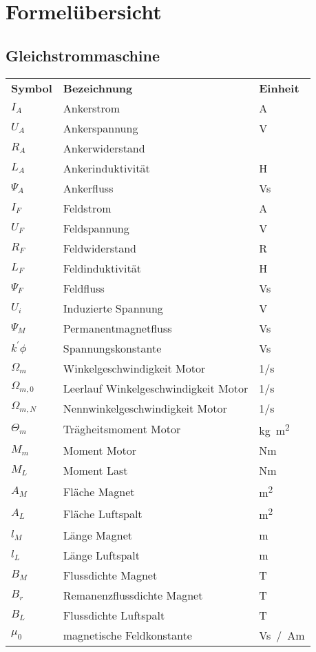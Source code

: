 \section{Formelübersicht} %
\subsection{Gleichstrommaschine} %
\begin{tabular}{L{2cm}lR{2cm}}
    \textbf{Symbol} &\textbf{Bezeichnung} &\textbf{Einheit}\\
	$I_A$  		&Ankerstrom  			&\si{A}\\
	$U_A$  		&Ankerspannung 			&\si{V}\\
	$R_A$  		&Ankerwiderstand 		&\si{\Omega} \\
	$L_A$		&Ankerinduktivität 		&\si{H}\\
	$\Psi_A$ 	&Ankerfluss 			&\si{Vs}\\
	$I_F$ 		&Feldstrom 				&\si{A}\\
	$U_F$ 		&Feldspannung 			&\si{V}\\
	$R_F$ 		&Feldwiderstand 		&\si{R}\\
	$L_F$ 		& Feldinduktivität 		&\si{H}\\
	$\Psi_F$ 	&Feldfluss 				&\si{Vs}\\
	$U_i$ 		&Induzierte Spannung 		&\si{V}\\
	$\Psi_M$ 	&Permanentmagnetfluss 		&\si{Vs}\\
	$k^{'} \phi$ 	&Spannungskonstante 	&\si{Vs}\\
	$\Omega_m$ 		&Winkelgeschwindigkeit Motor 			&\si{1/s}\\
	$\Omega_{m,0}$ 	&Leerlauf Winkelgeschwindigkeit Motor 	&\si{1/s}\\
	$\Omega_{m,N}$ 	&Nennwinkelgeschwindigkeit Motor 		&\si{1/s}\\
	$\Theta_m$ 		&Trägheitsmoment Motor 					&\si{kg m^{2}}\\
	$M_m$ 		&Moment Motor 			&\si{Nm}\\
	$M_L$ 		&Moment Last 			&\si{Nm}\\
	$A_M$ 		&Fläche Magnet 			&\si{m^{2}}\\
	$A_L$ 		&Fläche Luftspalt 		&\si{m^{2}}\\
	$l_M$ 		&Länge Magnet 			&\si{m}\\
	$l_L$ 		&Länge Luftspalt 		&\si{m}\\
	$B_M$ 		&Flussdichte Magnet 	&\si{T}\\
	$B_r$ 		&Remanenzflussdichte Magnet 	&\si{T}\\
	$B_L$ 		&Flussdichte Luftspalt 			&\si{T}\\
	$\mu_0$ 	&magnetische Feldkonstante 		& \si{Vs / Am}\\
\end{tabular}\\
